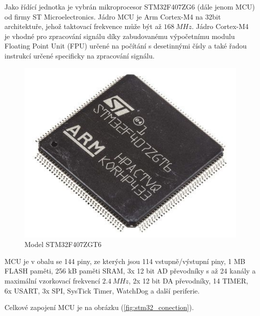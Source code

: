Jako řídící jednotka je vybrán mikroprocesor STM32F407ZG6 (dále jenom MCU) od firmy ST Microelectronics.
Jádro MCU je Arm Cortex-M4 na 32bit architektuře, jehož taktovací frekvence může být až $168 \ MHz$. Jádro Cortex-M4 je vhodné pro zpracování signálu díky zabudovanému výpočetnímu modulu Floating Point Unit (FPU) určené na
počítání s desetinnými čísly a také řadou instrukcí určené specificky na zpracování signálu.
\begin{figure}[H]
    \centering
    \includegraphics[width=0.5\linewidth]{pictures/stm32f407.jpg}
    \caption{Model STM32F407ZGT6 \cite{cite:STM32F407}}
    \label{fig:stm32}
\end{figure}
MCU je v obalu se 144 piny, ze kterých jsou 114 vstupně/výstupní piny, 1 MB FLASH paměti, 256 kB paměti SRAM, 3x 12 bit AD převodníky s až 24 kanály a maximální vzorkovací frekvencí $2.4 \ MHz$,
2x 12 bit DA převodníky, 14 TIMER, 6x USART, 3x SPI, SysTick Timer, WatchDog a další periferie.
\par
Celkové zapojení MCU je na obrázku (\ref{fig:stm32_conection}).

